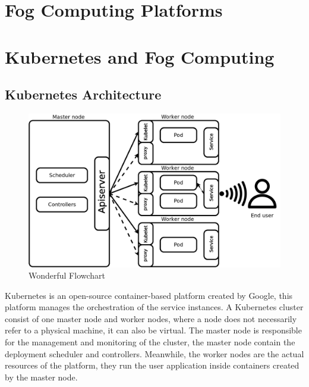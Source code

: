 \documentclass[letterpaper,twocolumn,10pt]{article}
\begin{document}
\section{Fog Computing Platforms}
\lipsum[20]
\section{Kubernetes and Fog Computing}

\subsection{Kubernetes Architecture}

\begin{figure}[th]
\begin{center}
\includegraphics[width=\textwidth/2]{images/arch.png}
\end{center}
\caption{Wonderful Flowchart}
\end{figure}

Kubernetes is an open-source container-based platform created by Google, this platform manages the orchestration of the service instances. A Kubernetes cluster consist of one master node and worker nodes, where a node does not necessarily refer to a physical machine, it can also be virtual. The master node is responsible for the management and monitoring of the cluster, the master node contain the deployment scheduler and controllers.  Meanwhile, the worker nodes are the actual resources of the platform, they run the user application inside containers created by the master node. 
\end{document}
